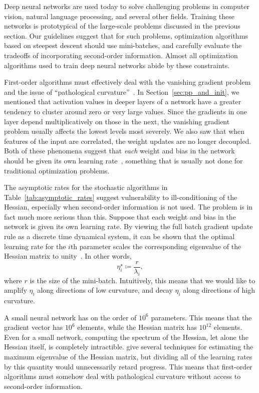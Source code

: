 \documentclass[11pt,a4paper]{article}
\numberwithin{equation}{section}
\begin{document}
Deep neural networks are used today to solve challenging problems in computer
vision, natural language processing, and several other fields. Training these
networks is prototypical of the large-scale problems discussed in the previous
section. Our guidelines suggest that for such problems, optimization algorithms
based on steepest descent should use mini-batches, and carefully evaluate the
tradeoffs of incorporating second-order information. Almost all optimization
algorithms used to train deep neural networks abide by these constraints.

First-order algorithms must effectively deal with the vanishing gradient problem
and the issue of ``pathological curvature''~\citep{martens2010deep}. In
Section~\ref{sec:pp_and_init}, we mentioned that activation values in deeper
layers of a network have a greater tendency to cluster around zero or very large
values. Since the gradients in one layer depend multiplicatively on those in the
next, the vanishing gradient problem usually affects the lowest levels most
severely. We also saw that when features of the input are correlated, the weight
updates are no longer decoupled. Both of these phenomena suggest that
\emph{each} weight and bias in the network should be given its own learning
rate~\citep{lecun-98b}, something that is usually not done for traditional
optimization problems.

The asymptotic rates for the stochastic algorithms in
Table~\ref{tab:asymptotic_rates} suggest vulnerability to ill-conditioning of
the Hessian, especially when second-order information is not used. The problem
is in fact much more serious than this. Suppose that each weight and bias in the
network is given its own learning rate. By viewing the full batch gradient
update rule as a discrete time dynamical system, it can be shown that the
optimal learning rate for the $i$th parameter scales the corresponding
eigenvalue of the Hessian matrix to unity~\citep{lecun-98b}. In other words,
\[
	\eta_i^\star \coloneqq \frac{r}{\lambda_i},
\]
where $r$ is the size of the mini-batch. Intuitively, this means that we would
like to amplify $\eta_i$ along directions of low curvature, and decay $\eta_i$
along directions of high curvature.

A small neural network has on the order of $10^6$ parameters. This means that
the gradient vector has $10^6$ elements, while the Hessian matrix has $10^{12}$
elements. Even for a small network, computing the spectrum of the Hessian, let
alone the Hessian itself, is completely intractible. \citet{lecun-98b} give
several techniques for estimating the maximum eigenvalue of the Hessian matrix,
but dividing all of the learning rates by this quantity would unnecessarily
retard progress. This means that first-order algorithms must somehow deal with
pathological curvature without access to second-order information.
\end{document}
